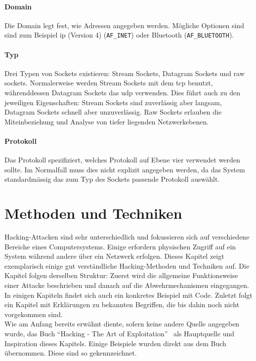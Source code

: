 \documentclass[11pt, a4paper]{article}
\begin{document}
\paragraph{Domain}
Die Domain legt fest, wie Adressen angegeben werden. Mögliche Optionen sind sind zum Beispiel \gls{ip} (Version 4) (\texttt{AF\_INET}) oder Bluetooth (\texttt{AF\_BLUETOOTH}).
\paragraph{Typ}
Drei Typen von Sockets existieren: Stream Sockets, Datagram Sockets und raw sockets. Normalerweise werden Stream Sockets mit dem \gls{tcp} benutzt, währenddessen Datagram Sockets das \gls{udp} verwenden. Dies führt auch zu den jeweiligen Eigenschaften: Stream Sockets sind zuverlässig aber langsam, Datagram Sockets schnell aber unzuverlässig. Raw Sockets erlauben die Miteinbeziehung und Analyse von tiefer liegenden Netzwerkebenen. 
\paragraph{Protokoll}
Das Protokoll spezifiziert, welches Protokoll auf Ebene vier verwendet werden sollte. Im Normalfall muss dies nicht explizit angegeben werden, da das System standardmässig das zum Typ des Sockets passende Protokoll auswählt.


\newpage
\section{Methoden und Techniken}\label{sec:methoden-und-techniken}
Hacking-Attacken sind sehr unterschiedlich und fokussieren sich auf verschiedene Bereiche eines Computersystems. Einige erfordern physischen Zugriff auf ein System während andere über ein Netzwerk erfolgen. Dieses Kapitel zeigt exemplarisch einige gut verständliche Hacking-Methoden und Techniken auf. Die Kapitel folgen derselben Struktur: Zuerst wird die allgemeine Funktionsweise einer Attacke beschrieben und danach auf die Abwehrmechanismen eingegangen. In einigen Kapiteln findet sich auch ein konkretes Beispiel mit Code. Zuletzt folgt ein Kapitel mit Erklärungen zu bekannten Begriffen, die bis dahin noch nicht vorgekommen sind. \\Wie am Anfang bereits erwähnt diente, sofern keine andere Quelle angegeben wurde, das Buch ``Hacking - The Art of Exploitation''~\cite{erickson2008hacking} als Hauptquelle und Inspiration dieses Kapitels. Einige Beispiele wurden direkt aus dem Buch übernommen. Diese sind so gekennzeichnet.
\end{document}
